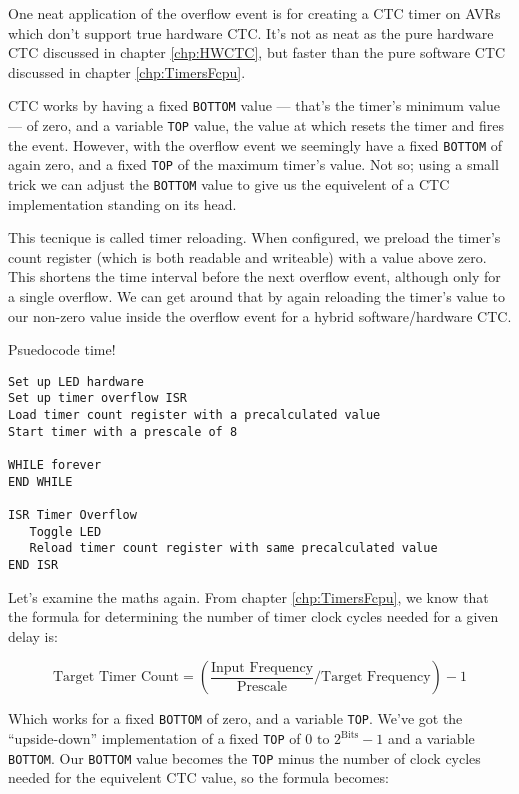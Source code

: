 \documentclass[a4paper,oneside,notitlepage]{book}
\begin{document}
One neat application of the overflow event is for creating a CTC timer on AVRs which don't support true hardware CTC. It's not as neat as the pure hardware CTC discussed in chapter \ref{chp:HWCTC}, but faster than the pure software CTC discussed in chapter \ref{chp:TimersFcpu}.

CTC works by having a fixed \texttt{BOTTOM} value --- that's the timer's minimum value --- of zero, and a variable \texttt{TOP} value, the value at which resets the timer and fires the event. However, with the overflow event we seemingly have a fixed \texttt{BOTTOM} of again zero, and a fixed \texttt{TOP} of the maximum timer's value. Not so; using a small trick we can adjust the \texttt{BOTTOM} value to give us the equivelent of a CTC implementation standing on its head.

This tecnique is called timer reloading. When configured, we preload the timer's count register (which is both readable and writeable) with a value above zero. This shortens the time interval before the next overflow event, although only for a single overflow. We can get around that by again reloading the timer's value to our non-zero value inside the overflow event for a hybrid software/hardware CTC.

Psuedocode time!

\begin{center}
\begin{lstlisting}[keywordstyle=\color{black},commentstyle=\color{black}]
Set up LED hardware
Set up timer overflow ISR
Load timer count register with a precalculated value
Start timer with a prescale of 8

WHILE forever
END WHILE

ISR Timer Overflow
   Toggle LED
   Reload timer count register with same precalculated value
END ISR
\end{lstlisting}
\end{center}

Let's examine the maths again. From chapter \ref{chp:TimersFcpu}, we know that the formula for determining the number of timer clock cycles needed for a given delay is: 

\begin{displaymath}
\text{Target Timer Count} = (\frac{\text{Input Frequency}}{\text{Prescale}} / \text{Target Frequency}) - 1  
\end{displaymath}

Which works for a fixed \texttt{BOTTOM} of zero, and a variable \texttt{TOP}. We've got the ``upside-down'' implementation of a fixed \texttt{TOP} of \(0 \text{ to } 2^\text{Bits}-1\) and a variable \texttt{BOTTOM}. Our \texttt{BOTTOM} value becomes the \texttt{TOP} minus the number of clock cycles needed for the equivelent CTC value, so the formula becomes: 
\end{document}
